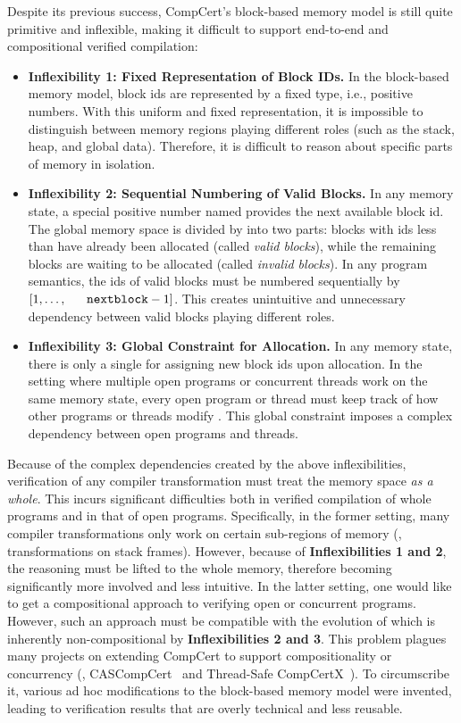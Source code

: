 Despite its previous success, CompCert's block-based memory model is
still quite primitive and inflexible, making it difficult to support
end-to-end and compositional verified compilation: 

\begin{itemize}
\item 
\textbf{Inflexibility 1: Fixed Representation of Block IDs.}
%
In the block-based memory model, block ids are represented by a fixed
type, i.e., positive numbers. With this uniform and fixed
representation, it is impossible to distinguish between memory regions
playing different roles (such as the stack, heap, and global
data). Therefore, it is difficult to reason about specific parts of
memory in isolation.

\item
\textbf{Inflexibility 2: Sequential Numbering of Valid Blocks.}  
%
In any memory state, a special positive number named \nextblock
provides the next available block id. The global memory space is
divided by \nextblock into two parts: blocks with ids less than
\nextblock have already been allocated (called \emph{valid blocks}),
while the remaining blocks are waiting to be allocated (called
\emph{invalid blocks}). In any program semantics, the ids of valid
blocks must be numbered sequentially by $[1,\ldots,\nextblock-1]$.
This creates unintuitive and unnecessary dependency between valid
blocks playing different roles.

\item
\textbf{Inflexibility 3: Global Constraint for Allocation.}
%
In any memory state, there is only a single \nextblock for assigning
new block ids upon allocation. In the setting where multiple open
programs or concurrent threads work on the same memory state, every
open program or thread must keep track of how other programs or
threads modify \nextblock. This global constraint imposes a complex
dependency between open programs and threads.
\end{itemize}

Because of the complex dependencies created by the above
inflexibilities, verification of any compiler transformation must
treat the memory space \emph{as a whole}. This incurs significant
difficulties both in verified compilation of whole programs and in
that of open programs. Specifically, in the former setting, many
compiler transformations only work on certain sub-regions of memory
(\eg, transformations on stack frames). However, because of
\textbf{Inflexibilities 1 and 2}, the reasoning must be lifted to the
whole memory, therefore becoming significantly more involved and less
intuitive. In the latter setting, one would like to get a
compositional approach to verifying open or concurrent
programs. However, such an approach must be compatible with the
evolution of \nextblock which is inherently non-compositional by
\textbf{Inflexibilities 2 and 3}. This problem plagues many projects on
extending CompCert to support compositionality or concurrency (\eg,
CASCompCert~\cite{cascompcert} and Thread-Safe
CompCertX~\cite{ccal18}). To circumscribe it, various ad hoc
modifications to the block-based memory model were invented, leading to
verification results that are overly technical and less reusable.

